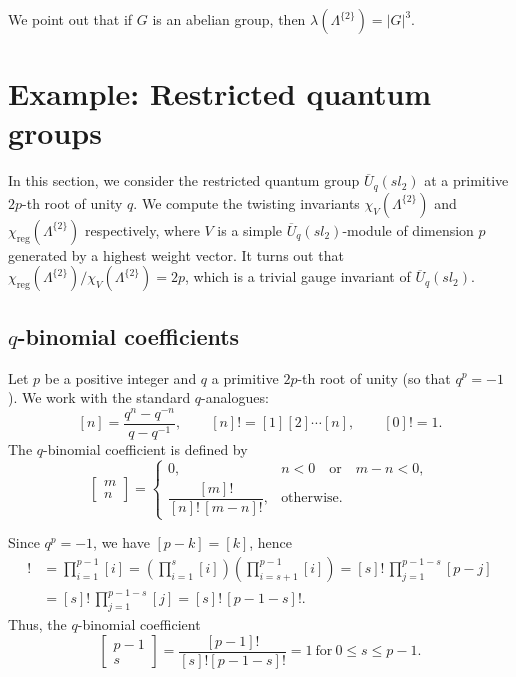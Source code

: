 \documentclass[11pt]{amsart}
\numberwithin{equation}{section}
\begin{document}
We point out that if $G$ is an abelian group, then  $\lambda(\Lambda^{\{2\}})=|G|^3.$





\section{\bf Example: Restricted quantum groups}
In this section, we consider the restricted quantum group $\overline{U}_q(sl_2)$ at a primitive $2p$-th root of unity $q$.  We compute the twisting invariants $\chi_V(\Lambda^{\{2\}})$ and $\chi_{\text{reg}}(\Lambda^{\{2\}})$ respectively, where $V$ is a simple $\overline{U}_q(sl_2)$-module of dimension $p$ generated by a highest weight vector. It turns out that $\chi_{\text{reg}}(\Lambda^{\{2\}})/\chi_V(\Lambda^{\{2\}})=2p$, which is a trivial gauge invariant of $\overline{U}_q(sl_2)$.

 

\subsection{$q$-binomial coefficients}

Let $p$ be a positive integer and $q$ a primitive $2p$-th root of unity (so that $q^p=-1$).  We work with the standard $q$-analogues:
\[
[n]=\frac{q^n-q^{-n}}{q-q^{-1}},\qquad [n]!=[1][2]\cdots[n],\qquad [0]!=1.
\]
The $q$-binomial coefficient is defined by
\[
\begin{bmatrix} m \\ n \end{bmatrix}
=
\begin{cases}
0, & n < 0 \quad \text{or} \quad m - n < 0, \\[1.2ex]
\dfrac{[m]!}{[n]! \, [m - n]!}, & \text{otherwise.}
\end{cases}
\]

Since $q^p=-1$, we have $[p-k]=[k]$, hence
\begin{align*}
[p-1]! &= \prod_{i=1}^{p-1}[i] = \left(\prod_{i=1}^{s}[i]\right)\left(\prod_{i=s+1}^{p-1}[i]\right)
= [s]!\,\prod_{j=1}^{p-1-s}[p-j]\\
&=[s]!\,\prod_{j=1}^{p-1-s}[j]= [s]!\,[p-1-s]!.
\end{align*}
Thus, the $q$-binomial coefficient 
\begin{equation}\label{eq:binom}\begin{bmatrix} p-1 \\ s \end{bmatrix}=\frac{[p-1]!}{[s]![p-1-s]!}
=1\ \text{for}\ 0\le s\le p-1.\end{equation}
\end{document}

